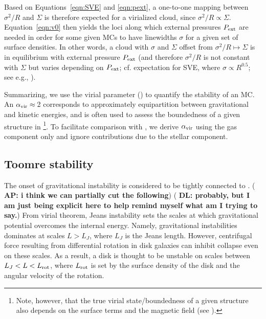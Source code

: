 \IfFileExists{emulateapjlegacy.cls}{\documentclass[iop]{emulateapjlegacy}}{\documentclass[iop]{emulateapj}}
\newcommand{\AP}[1]{({\bf \color{apcolor} AP: #1})}
\newcommand{\DL}[1]{({\bf \color{dlcolor} DL: #1})}
\begin{document}
Based on Equations~\ref{eqn:SVE} and \ref{eqn:pext}, a one-to-one mapping 
between $\sigma^2/R$ and $\Sigma$ is therefore expected for a virialized cloud, 
since $\sigma^2/R\propto\Sigma$. Equation~\ref{eqn:v0} 
then yields the loci along which external pressures $P_{\rm ext}$ are needed in order for some given MCs to have 
linewidths $\sigma$ for a given set of surface densities. %
In other words, a cloud with $\sigma$ and $\Sigma$ offset from $\sigma^2/R\mapsto\Sigma$ is in equilibrium with 
external pressure $P_{\rm ext}$ (and therefore $\sigma^2/R$ is not constant 
with $\Sigma$ but varies depending on $P_{\rm ext}$; cf. 
expectation for SVE, where $\sigma\propto R^{0.5}$; see e.g., \citealt{Heyer09a, Hughes10a, Hughes13b, Meidt13a}).

Summarizing, we use the virial parameter () to quantify the stability of an MC. 
An $\alpha_{\rm vir}\approx$\,2 corresponds to approximately equipartition between gravitational and kinetic energies, and is
 often used to assess the boundedness of a given structure in \obs \citep[see e.g., ][]{Kauffmann17b}\footnote{Note, however, that the true virial state/boundedness of a given structure also depends on the surface terms and the magnetic field (see ).}.
To facilitate comparison with \obs, we derive $\alpha_{\rm vir}$ using the gas component only and ignore contributions due to 
the stellar component. 

\subsection{Toomre stability}\label{sec:Q}

The onset of gravitational instability is considered to be tightly connected to \SF \citep[e.g.,][]{Kennicutt89a, Wang94a, Li05b, Li06a}. \AP{i think we can partially cut the following} \DL{probably, but I am just being explicit here to help remind myself what am I trying to say.}
From virial theorem, Jeans instability sets the scales at which gravitational potential overcomes the internal energy. Namely, gravitational instabilities dominates at scales $L > L_J$, where $L_J$ is the Jeans length. However, centrifugal force resulting from differential rotation in disk galaxies can inhibit collapse even on these scales. As a result, a disk is thought to be unstable on scales between $L_J < L < L_{\rm rot}$, where $L_{\rm rot}$ is set by the surface density of the disk and the angular velocity of the rotation. 
\end{document}
